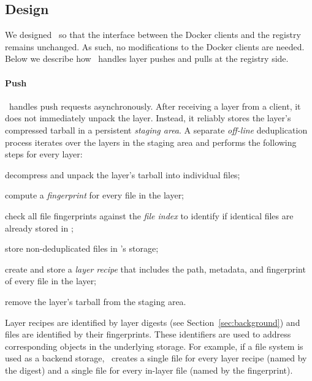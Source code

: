 \subsection{Design}
\label{sec:design}

%
We designed \sysname\ so that the interface between the Docker clients and the
registry remains unchanged.
%
As such, no modifications to the Docker clients are needed.
%
Below we describe how \sysname\ handles layer pushes and
pulls at the registry side.
%

\paragraph{Push}
%
\sysname\ handles push requests asynchronously.
%
After receiving a layer from a client, it does not immediately unpack the layer.
%
Instead, it reliably stores the layer's compressed tarball in a persistent
\emph{staging area}.
%
A separate \emph{off-line} deduplication process iterates over the layers in
the staging area and performs the following steps for every layer:
%
\begin{compactenumerate}
  \item decompress and unpack the layer's tarball into individual files;
  \item compute a \emph{fingerprint} for every file in the layer;
  \item check all file fingerprints against the \emph{file index} to
	identify if identical files are already stored in \sysname;
  \item store non-deduplicated files in \sysname's storage;
  \item create and store a \emph{layer recipe} that includes the path,
	metadata, and fingerprint of every file in the layer;
  \item remove the layer's tarball from the staging area.
\end{compactenumerate}

%
%
Layer recipes are identified by layer digests (see Section~\ref{sec:background})
and files are identified by their fingerprints.
%
These identifiers are used to address corresponding objects in the
underlying storage.
%
For example, if a file system is used as a backend storage, \sysname\ creates a
single file for every layer recipe (named by the digest) and a single file for
every in-layer file (named by the fingerprint).


